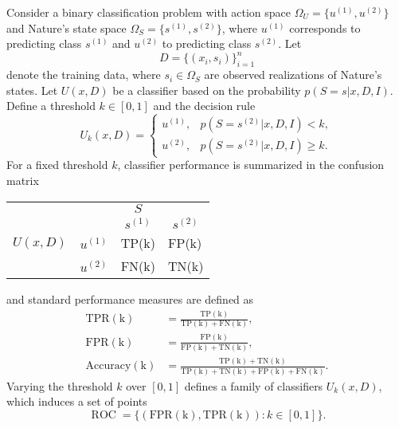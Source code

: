 \begin{example}
	Consider a binary classification problem with action space $\Omega_U = \{u^{(1)},u^{(2)}\}$ and Nature's state space $\Omega_S = \{s^{(1)}, s^{(2)}\}$, where $u^{(1)}$ corresponds to predicting class $s^{(1)}$ and $u^{(2)}$ to predicting class $s^{(2)}$. Let
	\begin{equation}
		D = \{(x_i,s_i)\}_{i=1}^n
	\end{equation}
	denote the training data, where $s_i \in \Omega_S$ are observed realizations of Nature's states. Let $U(x,D)$ be a classifier based on the probability $p(S = s | x, D, I)$. Define a threshold $k\in[0,1]$ and the decision rule
	\begin{equation}
		U_k(x,D) =
		\begin{cases}
			u^{(1)}, & p(S=s^{(2)} | x, D, I) < k,\\
			u^{(2)}, & p(S=s^{(2)} | x, D, I) \ge k.
		\end{cases}
	\end{equation}
	For a fixed threshold $k$, classifier performance is summarized in the confusion matrix
	\begin{center}
		\begin{tabular}{ c  c  c c}
			&& $S$ &  \\
			&& $s^{(1)}$ & $s^{(2)}$ \\
			\cline{3-4}
			$U(x,D)$ & $u^{(1)}$& \multicolumn{1}{|l}{TP(k)} & \multicolumn{1}{l|}{FP(k)}\\
			& $u^{(2)}$& \multicolumn{1}{|l}{FN(k)} & \multicolumn{1}{l|}{TN(k)}\\
			\cline{3-4}
		\end{tabular}
	\end{center}
	and standard performance measures are defined as
	\begin{align}
		\operatorname{TPR(k)} &= \frac{\operatorname{TP(k)}}{\operatorname{TP(k)} + \operatorname{FN(k)}},\\
		\operatorname{FPR(k)} &= \frac{\operatorname{FP(k)}}{\operatorname{FP(k)} + \operatorname{TN(k)}},\\
		\operatorname{Accuracy(k)} &= \frac{\operatorname{TP(k)} + \operatorname{TN(k)}}{\operatorname{TP(k)} + \operatorname{TN(k)} + \operatorname{FP(k)} + \operatorname{FN(k)}}.
	\end{align}
	Varying the threshold $k$ over $[0,1]$ defines a family of classifiers $U_k(x,D)$, which induces a set of points
	\begin{equation}
		\operatorname{ROC} = \{ (\operatorname{FPR(k)}, \operatorname{TPR(k)}) : k \in [0,1] \}.

\end{equation}
\end{example}
